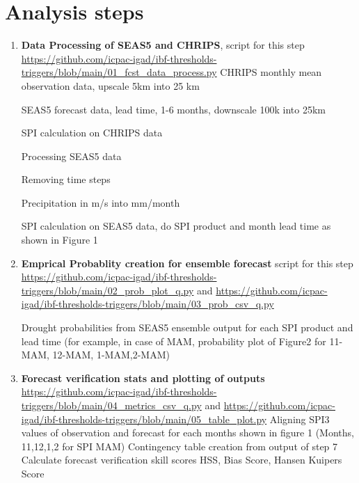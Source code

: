 \section{Analysis steps}

\begin{enumerate}

\item \textbf{Data Processing of SEAS5 and CHRIPS}, script for this step \url{https://github.com/icpac-igad/ibf-thresholds-triggers/blob/main/01_fcst_data_process.py}
\subitem CHRIPS monthly mean observation data, upscale 5km into 25 km 

\subitem SEAS5 forecast data, lead time, 1-6 months, downscale 100k into 25km 

\subitem SPI calculation on CHRIPS data 

\subitem Processing SEAS5 data 

\subitem Removing time steps 

\subitem Precipitation in m/s into mm/month 

\subitem SPI calculation on SEAS5 data, do SPI product and month lead time as shown in Figure 1 

\item \textbf{Emprical Probablity creation for ensemble forecast} script for this step \url{https://github.com/icpac-igad/ibf-thresholds-triggers/blob/main/02_prob_plot_q.py} and \url{https://github.com/icpac-igad/ibf-thresholds-triggers/blob/main/03_prob_csv_q.py}

\subitem Drought probabilities from SEAS5 ensemble output for each SPI product and lead time (for example, in case of MAM, probability plot of Figure2 for 11-MAM, 12-MAM, 1-MAM,2-MAM) 

\item \textbf{Forecast verification stats and plotting of outputs} \url{https://github.com/icpac-igad/ibf-thresholds-triggers/blob/main/04_metrics_csv_q.py} and \url{https://github.com/icpac-igad/ibf-thresholds-triggers/blob/main/05_table_plot.py}
\subitem Aligning SPI3 values of observation and forecast for each months shown in figure 1 (Months, 11,12,1,2 for SPI MAM) 
\subitem Contingency table creation from output of step 7 
\subitem Calculate forecast verification skill scores HSS, Bias Score, Hansen Kuipers Score 	
\end{enumerate}











